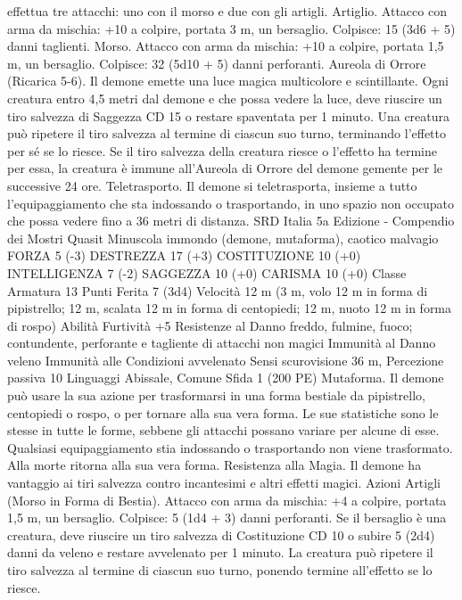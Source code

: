 \begin{multicols}{2}
effettua tre attacchi: uno con il morso e due con gli artigli.
Artiglio. Attacco con arma da mischia: +10 a colpire, portata 3
m, un bersaglio.
Colpisce: 15 (3d6 + 5) danni taglienti.
Morso. Attacco con arma da mischia: +10 a colpire, portata 1,5
m, un bersaglio.
Colpisce: 32 (5d10 + 5) danni perforanti.
Aureola di Orrore (Ricarica 5-6). Il demone emette una luce
magica multicolore e scintillante. Ogni creatura entro 4,5 metri
dal demone e che possa vedere la luce, deve riuscire un tiro
salvezza di Saggezza CD 15 o restare spaventata per 1 minuto.
Una creatura può ripetere il tiro salvezza al termine di ciascun
suo turno, terminando l’effetto per sé se lo riesce. Se il tiro
salvezza della creatura riesce o l’effetto ha termine per essa, la
creatura è immune all’Aureola di Orrore del demone gemente
per le successive 24 ore.
Teletrasporto. Il demone si teletrasporta, insieme a tutto
l’equipaggiamento che sta indossando o trasportando, in uno
spazio non occupato che possa vedere fino a 36 metri di distanza.
SRD Italia 5a Edizione - Compendio dei Mostri
Quasit
Minuscola immondo (demone, mutaforma), caotico malvagio
FORZA 5 (-3)
DESTREZZA 17 (+3)
COSTITUZIONE 10 (+0)
INTELLIGENZA 7 (-2)
SAGGEZZA 10 (+0)
CARISMA 10 (+0)
Classe Armatura 13
Punti Ferita 7 (3d4)
Velocità 12 m (3 m, volo 12 m in forma di pipistrello; 12 m,
scalata 12 m in forma di centopiedi; 12 m, nuoto 12 m in forma
di rospo)
Abilità Furtività +5
Resistenze al Danno freddo, fulmine, fuoco; contundente,
perforante e tagliente di attacchi non magici
Immunità al Danno veleno
Immunità alle Condizioni avvelenato
Sensi scurovisione 36 m, Percezione passiva 10
Linguaggi Abissale, Comune
Sfida 1 (200 PE)
Mutaforma. Il demone può usare la sua azione per trasformarsi
in una forma bestiale da pipistrello, centopiedi o rospo, o per
tornare alla sua vera forma. Le sue statistiche sono le stesse in
tutte le forme, sebbene gli attacchi possano variare per alcune di
esse. Qualsiasi equipaggiamento stia indossando o trasportando
non viene trasformato. Alla morte ritorna alla sua vera forma.
Resistenza alla Magia. Il demone ha vantaggio ai tiri salvezza
contro incantesimi e altri effetti magici.
Azioni
Artigli (Morso in Forma di Bestia). Attacco con arma da
mischia: +4 a colpire, portata 1,5 m, un bersaglio.
Colpisce: 5 (1d4 + 3) danni perforanti. Se il bersaglio è una
creatura, deve riuscire un tiro salvezza di Costituzione CD 10 o
subire 5 (2d4) danni da veleno e restare avvelenato per 1 minuto.
La creatura può ripetere il tiro salvezza al termine di ciascun suo
turno, ponendo termine all’effetto se lo riesce.

\end{multicols}
